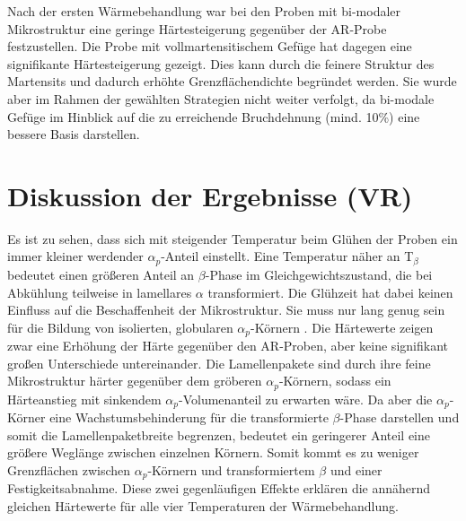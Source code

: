 Nach der ersten Wärmebehandlung war bei den Proben mit bi-modaler Mikrostruktur eine geringe Härtesteigerung gegenüber der AR-Probe festzustellen. 
Die Probe mit vollmartensitischem Gefüge hat dagegen eine signifikante Härtesteigerung gezeigt. Dies kann durch die feinere Struktur des Martensits und dadurch erhöhte Grenzflächendichte begründet werden. Sie wurde aber im Rahmen der gewählten Strategien nicht weiter verfolgt, da bi-modale Gefüge im Hinblick auf die zu erreichende Bruchdehnung (mind. 10\%) eine bessere Basis darstellen.


\section{Diskussion der Ergebnisse (VR)}

Es ist zu sehen, dass sich mit steigender Temperatur beim Glühen der Proben ein immer kleiner werdender $\alpha_p$-Anteil einstellt. Eine Temperatur näher an T$_{\beta}$ bedeutet einen größeren Anteil an $\beta$-Phase im Gleichgewichtszustand, die bei Abkühlung teilweise in lamellares $\alpha$ transformiert. Die Glühzeit hat dabei keinen Einfluss auf die Beschaffenheit der Mikrostruktur. Sie muss nur lang genug sein für die Bildung von isolierten, globularen $\alpha_p$-Körnern \cite{G.LutjeringJ.C.WilliamsA.Gysler.}. 
Die Härtewerte zeigen zwar eine Erhöhung der Härte gegenüber den AR-Proben, aber keine signifikant großen Unterschiede untereinander. Die Lamellenpakete sind durch ihre feine Mikrostruktur härter gegenüber dem gröberen $\alpha_p$-Körnern, sodass ein Härteanstieg mit sinkendem $\alpha_p$-Volumenanteil zu erwarten wäre. Da aber die $\alpha_p$-Körner eine Wachstumsbehinderung für die transformierte $\beta$-Phase darstellen und somit die Lamellenpaketbreite begrenzen, bedeutet ein geringerer Anteil eine größere Weglänge zwischen einzelnen Körnern. Somit kommt es zu weniger Grenzflächen zwischen $\alpha_p$-Körnern und transformiertem $\beta$ und einer Festigkeitsabnahme. Diese zwei gegenläufigen Effekte erklären die annähernd gleichen Härtewerte für alle vier Temperaturen der Wärmebehandlung. 